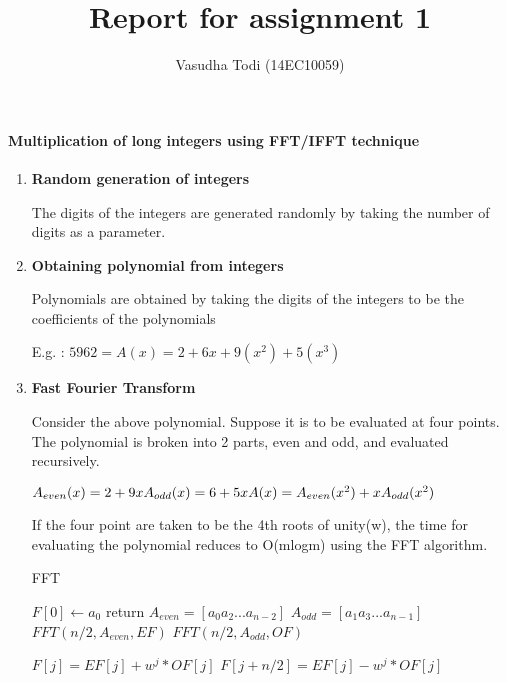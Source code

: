 \documentclass[a4paper,11pt]{article}
\title{Report for assignment 1}
\author{Vasudha Todi (14EC10059)}
\begin{document}
\maketitle

\paragraph{Multiplication of long integers using FFT/IFFT technique}
\begin{enumerate}
 \item \textbf{Random generation of integers}

 The digits of the integers are generated randomly by taking the number of digits as a parameter.

 \item \textbf{Obtaining polynomial from integers}
 
 Polynomials are obtained by taking the digits of the integers to be the coefficients of the polynomials
 
 E.g. : 
   $5962 = A(x) = 2 + 6x + 9(x^2) + 5(x^3)$
 
 \item \textbf{Fast Fourier Transform}
 
 Consider the above polynomial. Suppose it is to be evaluated at four points. The polynomial is broken into 2 parts, even and odd, and evaluated recursively.
 
   $A_{even}(x) = 2 + 9x\\
    A_{odd}(x) = 6 + 5x\\
    A(x) = A_{even}(x^2) + x A_{odd}(x^2)$
    
 If the four point are taken to be the 4th roots of unity(w), the time for evaluating the polynomial reduces to O(mlogm) using the FFT algorithm.
 
    \begin{algorithm}
    \caption{FFT}
    \begin{algorithmic}[1]
        \State $F\left[0\right] \gets a_{0}$ 
        \State return
    \EndIf
    \State $A_{even} = \left[ a_{0} a_{2} ... a_{n-2} \right]$
    \State $A_{odd} = \left[ a_{1} a_{3} ... a_{n-1} \right]$
    \State $FFT(n/2, A_{even}, EF)$
    \State $FFT(n/2, A_{odd}, OF)$
    \end{algorithmic}
    \end{algorithm}
    
    \begin{algorithm}
    \begin{algorithmic}[1]
        \State $F\left[j\right] = EF\left[j\right] + w^j*OF\left[j\right]$
        \State $F\left[j+n/2\right] = EF\left[j\right] - w^j*OF\left[j\right]$
    \EndFor
    \end{algorithmic}
    \end{algorithm}
 

\end{enumerate}
\end{document}

